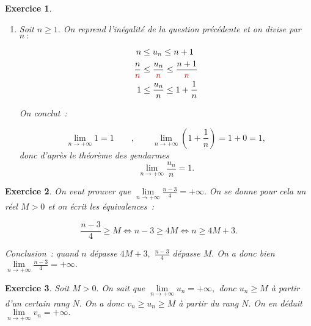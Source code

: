 \documentclass[10pt]{article}
\newtheorem{exo}{Exercice}
\begin{document}
\begin{exo}
\begin{enumerate}
\begin{itemize}
Puis on ajoute  $\textcolor{blue}{0,4k+1}~:$

\begin{align*}
0,6k\textcolor{blue}{+0,4k+1}&\leq 0,6u_k\textcolor{blue}{+0,4k+1}\leq 0,6k+0,6\textcolor{blue}{+0,4k+1}\\
k+1&\leq 0,6u_k+0,4k+1\leq k+1,6\\
k+1&\leq u_{k+1}\leq k+1,6
\end{align*}

Or $k+1,6\leq k+2,$ donc la propriété $\mathcal{P}_{k+1}$ est vraie.
\item[{\textbullet}] \textbf{Conclusion.} $\mathcal{P}_0$ est vraie et $\mathcal{P}_n$ est héréditaire, donc elle est vraie pour tout $n\in\mathbb{N}.$
\end{itemize}
\item Soit $n\geq 1.$ On reprend l'inégalité de la question précédente et on divise par $n~:$

\begin{align*}
n&\leq u_n\leq n+1\\
\frac{n}{\textcolor{red}{n}}&\leq \frac{u_n}{\textcolor{red}{n}}\leq \frac{n+1}{\textcolor{red}{n}}\\
1&\leq \frac{u_n}{n}\leq 1+\frac{1}{n}
\end{align*}

\medskip

On conclut~:

\[\lim\limits_{n\to +\infty}1=1\qquad , \qquad \lim\limits_{n\to +\infty}\left(1+\frac{1}{n}\right)=1+0=1,\] donc d'après le théorème des gendarmes
\[\lim\limits_{n\to +\infty}\frac{u_n}{n}=1.\]

\end{enumerate}

\end{exo}


\begin{exo}

On veut prouver que $\lim\limits_{n\to +\infty}\frac{n-3}{4}=+\infty.$ On se donne pour cela un réel $M> 0$ et on écrit les équivalences~:

\[\frac{n-3}{4}\geq M \iff n-3\geq 4M\iff n\geq 4M+3.\]

Conclusion~: quand $n$ dépasse $ 4M+3,$ $\frac{n-3}{4}$ dépasse $M.$ On a donc bien $\lim\limits_{n\to +\infty}\frac{n-3}{4}=+\infty.$



\end{exo}

\begin{exo}

Soit $M>0.$ On sait que $\lim\limits_{n\to +\infty}u_n=+\infty,$ donc $u_n\geq M$ à partir d'un certain rang $N.$ On a donc $v_n\geq u_n\geq M$ à partir du rang $N.$ On en déduit $\lim\limits_{n\to +\infty}v_n=+\infty.$



\end{exo}
\end{document}
